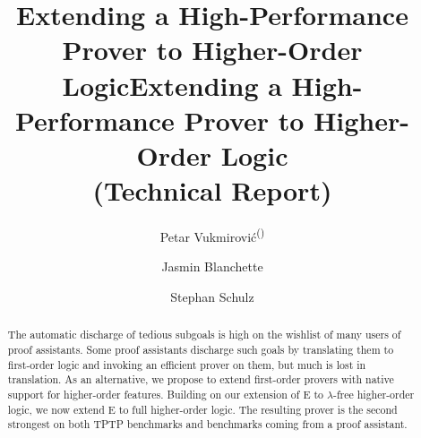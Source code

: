 \newcommand{\comb}[1]{\ensuremath{\mathsf{#1}}}
\newcommand{\neglit}[1]{\ensuremath{#1 \not\eq \itrue}}
\newcommand{\poslit}[1]{\ensuremath{#1 \eq \itrue}}
\newcommand{\lland}{\mathrel\land}
\newcommand{\llor}{\mathrel\lor}
\newcommand{\ccup}{\mathrel\cup}
\newcommand{\ccap}{\mathrel\cap}

\newcommand{\db}[1]{\ensuremath{\mathbf{#1}}}
\newcommand{\dbvar}[1]{\ensuremath{\textbf{\textit{#1}}}}
\newcommand{\internallam}{\ensuremath{\texttt{LAM}}}
\newcommand{\internalat}{\ensuremath{\texttt{@}}}

\newcommand{\lambdabf}{\pmb{\lambda}} %
\newcommand{\betabf}{\pmb{\beta}} %
\newcommand{\etabf}{\pmb{\eta}} %



\newcommand\CORR{\textsuperscript{(\vthinspace\Letter\vthinspace)}}

\confrep
{\title{Extending a High-Performance Prover to Higher-Order Logic}}
{\title{Extending a High-Performance Prover to Higher-Order Logic \\ (Technical Report)}}

\author{Petar Vukmirovi\'c\CORR
  \and
  Jasmin Blanchette
  \and
  Stephan Schulz
  }


\maketitle

\begin{abstract}%
  The automatic discharge of tedious subgoals is high on the wishlist of many
  users of proof assistants. Some proof assistants discharge such goals
  by translating them to first-order logic and invoking an efficient prover on
  them, but much is lost in translation. As an alternative,
  we propose to extend first-order provers with native support for
  higher-order features. Building on our extension of E to $\lambda$-free
  higher-order logic, we now extend E to full higher-order logic.
  The resulting prover is the second strongest on both TPTP benchmarks and
  benchmarks coming from a proof assistant.
\end{abstract}

